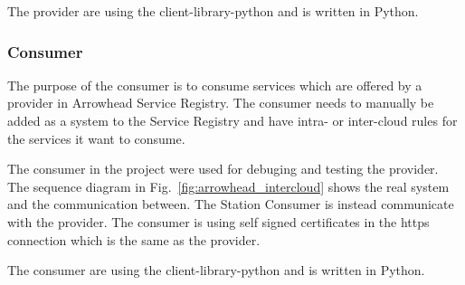 The provider are using the client-library-python and is written in Python. 

\subsubsection{Consumer}
The purpose of the consumer is to consume services which are offered by a provider in Arrowhead Service Registry. 
The consumer needs to manually be added as a system to the Service Registry and have intra- or inter-cloud rules for the services it want to consume.
  
The consumer in the project were used for debuging and testing the provider. The sequence diagram in Fig.~\ref{fig:arrowhead_intercloud} shows the real system and the communication between. The Station Consumer is instead communicate with the provider. 
The consumer is using self signed certificates in the https connection which is the same as the provider. 

The consumer are using the client-library-python and is written in Python.

